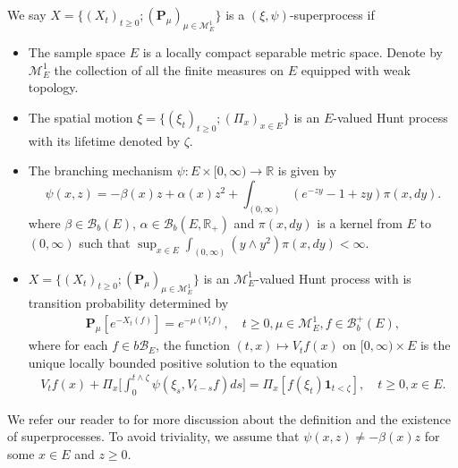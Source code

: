 \documentclass[12pt]{amsart}
\theoremstyle{plain}
\theoremstyle{definition}
\numberwithin{equation}{section}
\begin{document}
\subsection{}
\label{sec: definition of superprocess}
    We say $X=\{(X_t)_{t\geq 0}; (\mathbf P_\mu)_{\mu \in \mathcal M^1_E}\}$ is a $(\xi,\psi)$-superprocess if
\begin{itemize}
\item
    The sample space $E$ is a locally compact separable metric space.
    Denote by $\mathcal M_E^1$ the collection of all the finite measures on $E$ equipped with weak topology.
\item
    The spatial motion $\xi=\{(\xi_t)_{t\geq 0};(\Pi_x)_{x\in E}\}$ is an $E$-valued Hunt process with its lifetime denoted by $\zeta$.
\item
    The branching mechanism $\psi: E\times[0,\infty) \to \mathbb R$ is given by
\begin{equation}
\label{eq: branching mechanism}
    \psi(x,z)=
    - \beta(x) z + \alpha (x) z^2 + \int_{(0,\infty)} (e^{-zy} - 1 + zy) \pi(x,dy).
\end{equation}
    where $\beta \in \mathcal B_b(E)$, $\alpha \in \mathcal B_b(E, \mathbb R_+)$ and $\pi(x,dy)$ is a kernel from $E$ to $(0,\infty)$ such that $\sup_{x\in E} \int_{(0,\infty)} (y\wedge y^2) \pi(x,dy) < \infty$.
\item
    $X=\{(X_t)_{t\geq 0}; (\mathbf P_\mu)_{\mu \in \mathcal M^1_E}\}$ is an $\mathcal M^1_E$-valued Hunt process with is transition probability determined by
\begin{align}
    \mathbf P_\mu [e^{-X_t(f)}] = e^{-\mu(V_tf)},
    \quad t\geq 0, \mu \in \mathcal M_E^1, f\in \mathscr B^+_b(E),
\end{align}
    where for each $f\in b\mathscr B_E$, the function $(t,x)\mapsto V_tf(x)$ on $[0,\infty) \times E$ is the unique locally bounded positive solution to the equation
\begin{align}\label{eq:FKPP_in_definition}
    V_tf(x) + \Pi_x \Big[  \int_0^{t\wedge \zeta} \psi(\xi_s,V_{t-s}f)ds \Big]
    = \Pi_x [ f(\xi_t)\mathbf 1_{t<\zeta} ],
    \quad t \geq 0, x \in E.
\end{align}
\end{itemize}
    We refer our reader to \cite{Li2011Measure-valued} for more discussion about the definition and the existence of superprocesses.
    To avoid triviality, we assume that $\psi(x,z)\neq -\beta(x)z$ for some $x \in E$ and $z \geq 0$.
\end{document}
